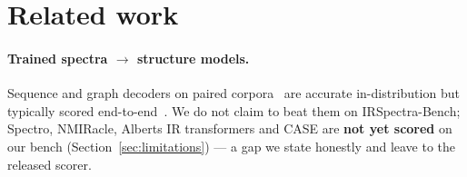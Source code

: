 \documentclass{article}
\begin{document}
\section{Related work}
\label{sec:related-work}

\paragraph{Trained spectra $\to$ structure models.}
Sequence and graph decoders on paired
corpora~\citep{chacko2024spectro,hu2024multitask,yang2026nmrtrans,ottomano2025nmiracle,alberts2024ir,alberts2025benchmarks}
are accurate in-distribution but typically scored end-to-end~\citep{pesek2021database}.
We do not claim to beat them on IRSpectra-Bench; Spectro, NMIRacle, Alberts IR transformers
and CASE are \textbf{not yet scored} on our bench (Section~\ref{sec:limitations}) --- a gap we
state honestly and leave to the released scorer.
\end{document}
